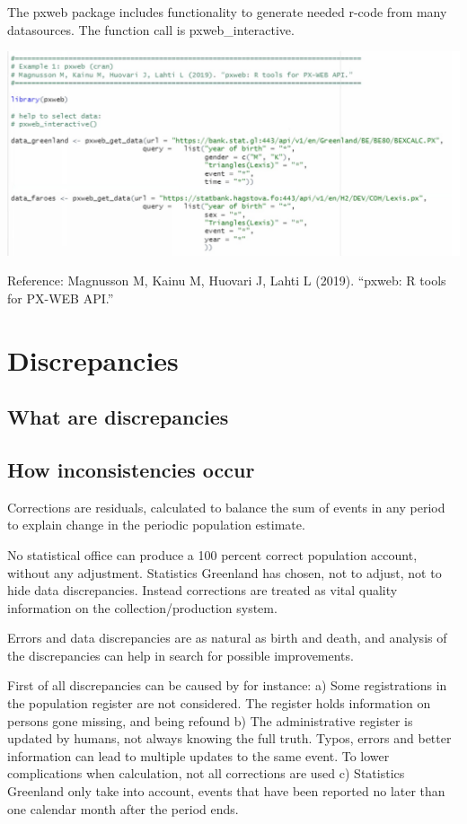 \documentclass[USenglish]{article}
\begin{document}
The pxweb package includes functionality to generate needed r-code from many datasources. The function call is pxweb\_interactive.


\includegraphics[scale=0.22]{images/pxwebR_GF.png}


Reference: Magnusson M, Kainu M, Huovari J, Lahti L (2019). “pxweb: R tools for PX-WEB API.”


\section{Discrepancies}

\subsection{What are discrepancies}



\subsection{How inconsistencies occur}

Corrections are residuals, calculated to balance the sum of events in any period to explain change in the periodic population estimate.

No statistical office can produce a 100 percent correct population account, without any adjustment. Statistics Greenland has chosen, not to adjust, not to hide data discrepancies. Instead corrections are treated as vital quality information on the collection/production system.

Errors and data discrepancies are as natural as birth and death, and analysis of the discrepancies can help in search for possible improvements.

First of all discrepancies can be caused by for instance: a) Some registrations in the population register are not considered. The register holds information on persons gone missing, and being refound b) The administrative register is updated by humans, not always knowing the full truth. Typos, errors and better information can lead to multiple updates to the same event. To lower complications when calculation, not all corrections are used c) Statistics Greenland only take into account, events that have been reported no later than one calendar month after the period ends.
\end{document}
